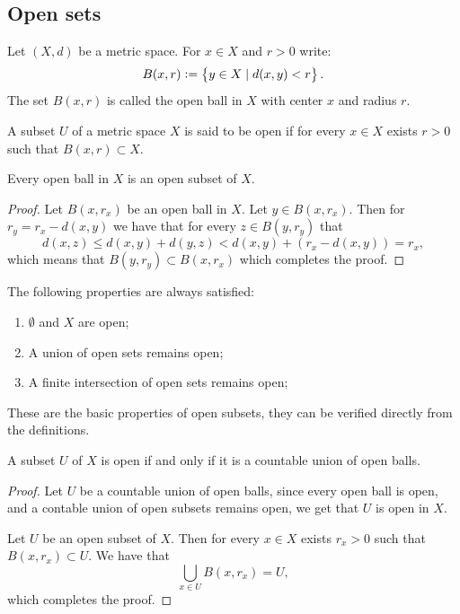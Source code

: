 \documentclass[11pt,a4paper]{article}
\begin{document}
\subsection{Open sets}

\begin{definition}
  Let $(X,d)$ be a metric space. For $x \in X$ and $r > 0$ write:
  \[
    B(x,r) := \left\{y \in X \mid d(x,y) < r\right\}.
  \]
  The set $B(x,r)$ is called the open ball in $X$ with center $x$
  and radius $r$.
\end{definition}

\begin{definition}
  A subset $U$ of a metric space $X$ is said to be open if for every
  $x \in X$ exists $r > 0$ such that $B(x,r) \subset X$.
\end{definition}

\begin{proposition}
  Every open ball in $X$ is an open subset of $X$.
\end{proposition}
\begin{proof}
  Let $B(x,r_x)$ be an open ball in $X$. Let $y \in B(x,r_x)$. Then for
  $r_y = r_x - d(x,y)$ we have that for every $z \in B(y,r_y)$ that
  \[
    d(x,z) \le d(x,y) + d(y,z) < d(x,y) + (r_x - d(x,y)) = r_x,
  \]
  which means that $B(y,r_y) \subset B(x,r_x)$ which completes the proof.
\end{proof}

\begin{proposition}
  The following properties are always satisfied:
  \begin{enumerate}
    \item[(1)] $\emptyset$ and $X$ are open;
    \item[(2)] A union of open sets remains open;
    \item[(3)] A finite intersection of open sets remains open;
  \end{enumerate}
\end{proposition}
These are the basic properties of open subsets, they can be verified
directly from the definitions.

\begin{proposition}
  A subset $U$ of $X$ is open if and only if it is a countable union of
  open balls.
\end{proposition}
\begin{proof}
  Let $U$ be a countable union of open balls, since every open ball is
  open, and a contable union of open subsets remains open, we get that
  $U$ is open in $X$.

  Let $U$ be an open subset of $X$. Then for every $x \in X$ exists
  $r_x > 0$ such that $B(x,r_x) \subset U$. We have that
  \[
    \bigcup_{x \in U} B(x,r_x) = U,
  \]
  which completes the proof.
\end{proof}
\end{document}
